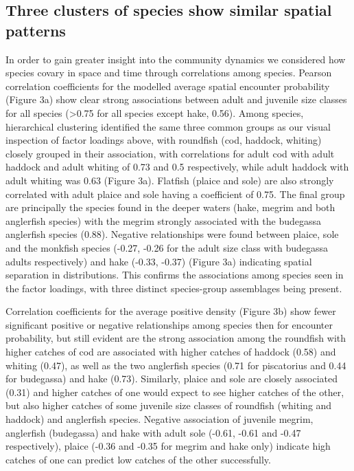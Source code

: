 \documentclass{nature}
\begin{document}
\begin{linenumbers}
\subsection{Three clusters of species show similar spatial patterns} In order to
gain greater insight into the community dynamics we considered how
species covary in space and time through correlations among species. 
Pearson correlation coefficients for the modelled average spatial
encounter probability (Figure 3a) show clear strong associations between adult
and juvenile size classes for all species (\textgreater 0.75 for all species
except hake, 0.56).  Among species, hierarchical clustering identified
the same three common groups as our visual inspection of factor loadings above,
with roundfish (cod, haddock, whiting) closely grouped in their association,
with correlations for adult cod with adult haddock and adult whiting of 0.73
and 0.5 respectively, while adult haddock with adult whiting was 0.63 (Figure
3a). Flatfish (plaice and sole) are also strongly correlated with adult plaice
and sole having a coefficient of 0.75.  The final group are principally the
species found in the deeper waters (hake, megrim and both anglerfish species)
with the megrim strongly associated with the budegassa anglerfish species
(0.88). Negative relationships were found between plaice, sole and the monkfish
species (-0.27, -0.26 for the adult size class with budegassa adults
respectively) and hake (-0.33, -0.37) (Figure 3a) indicating spatial separation
in distributions. This confirms the associations among species seen in the
factor loadings, with three distinct species-group assemblages being present.

Correlation coefficients for the average positive density (Figure 3b) show
fewer significant positive or negative relationships among species then
for encounter probability, but still evident are the strong association among
the roundfish with higher catches of cod are associated with higher catches of
haddock (0.58) and whiting (0.47), as well as the two anglerfish species (0.71
for piscatorius and 0.44 for budegassa) and hake (0.73). Similarly, plaice and
sole are closely associated (0.31) and higher catches of one would expect to
see higher catches of the other, but also higher catches of some juvenile size
classes of roundfish (whiting and haddock) and anglerfish species. Negative
association of juvenile megrim, anglerfish (budegassa) and hake with adult sole
(-0.61, -0.61 and -0.47 respectively), plaice (-0.36 and -0.35 for megrim and
hake only) indicate high catches of one can predict low catches of the other
successfully.


\end{linenumbers}
\end{document}
